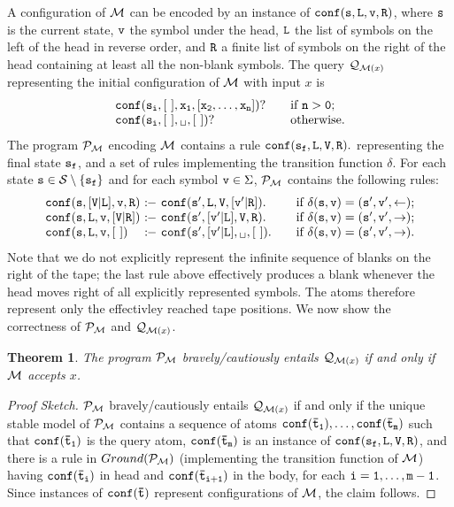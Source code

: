 \documentclass{tlp}
\newcommand{\derives}{\ensuremath{\mathtt{\ :\!\!-}\ }}
\newcommand{\p}{\ensuremath{{\mathcal{P}}}}
\newcommand{\q}{\ensuremath{{\cal Q}}}
\newcommand{\ground}[1]{\ensuremath{Ground(#1)}}
\newenvironment{dlvcode}
  {\begin{displaymath}\begin{array}{l}}
  {\end{array}\end{displaymath}}
\newtheorem{theorem}{Theorem}[section]
\renewcommand{\t}{\bar t}
\newcommand{\blank}{\ensuremath{{\empty}_\sqcup}}
\begin{document}
A configuration of $\cal M$ can be encoded by an instance of $\tt conf(s,L,v,R)$,
where $\tt s$ is the current state, $\tt v$ the symbol under the head,
$\tt L$ the list of symbols on the left of the head in reverse order,
and $\tt R$ a finite list of symbols on the right of the head containing
at least all the non-blank symbols.
The query $\q_{{\cal M}(x)}$ representing the initial configuration
of $\cal M$ with input $x$ is
\begin{dlvcode}
\begin{array}{lcl}
\tt conf(s_i,[\ ],x_1,[x_2, \ldots, x_n])? && \tt \mbox{if } n > 0; \\
\tt conf(s_i,[\ ],\blank,[\ ])? && \tt \mbox{otherwise.}
\end{array}
\end{dlvcode}The program $\p_{\cal M}$ encoding $\cal M$ contains a rule
$\tt conf(s_f,L,V,R).$ representing the final state $\tt s_f$,
and a set of rules implementing the transition function $\delta$.
For each state ${\tt s} \in {\cal S} \setminus \{{\tt s_f}\}$ and for 
each symbol ${\tt v} \in \Sigma$, $\p_{\cal M}$ contains the following rules:
\begin{dlvcode}
\begin{array}{lcl}
\tt conf(s,[V|L],v,R) \derives conf(s',L,V,[v'|R]). && \tt \mbox{if } \delta(s,v) = (s',v',\leftarrow); \\
\tt conf(s,L,v,[V|R]) \derives conf(s',[v'|L],V,R). && \tt \mbox{if } \delta(s,v) = (s',v',\rightarrow); \\
\tt conf(s,L,v,[\ ]) \ \ \ \derives conf(s',[v'|L],\blank,[\ ]). && \tt \mbox{if } \delta(s,v) = (s',v',\rightarrow).
\end{array}
\end{dlvcode}Note that we do not explicitly represent the infinite sequence of blanks on the right of the tape; the last rule above effectively produces a blank whenever the head moves right of all explicitly represented symbols. The atoms therefore represent only the effectivley reached tape positions. We now show the correctness of $\p_{\cal M}$ and $\q_{{\cal M}(x)}$.

\begin{theorem}\label{theo:turingCorrectness}
The program $\p_{\cal M}$ bravely/cautiously
entails $\q_{{\cal M}(x)}$ if and only if $\cal M$ accepts $x$.
\end{theorem}
\begin{proof}[Proof Sketch]
$\p_{\cal M}$ bravely/cautiously entails $\q_{{\cal M}(x)}$
if and only if the unique stable model of $\p_{\cal M}$ contains
a sequence of atoms $\tt conf(\t_1), \ldots, conf(\t_m)$ such that
${\tt conf(\t_1)}$ is the query atom,
${\tt conf(\t_m)}$ is an instance of ${\tt conf(s_f,L,V,R)}$,
and there is a rule in $\ground{\p_{\cal M}}$ (implementing the transition
function of $\cal M$)
having ${\tt conf(\t_i)}$ in head and ${\tt conf(\t_{i+1})}$ in the body,
for each $\tt i = 1, \ldots, m-1$.
Since instances of $\tt conf(\t)$ represent configurations of $\cal M$,
the claim follows.
\end{proof}
\end{document}
